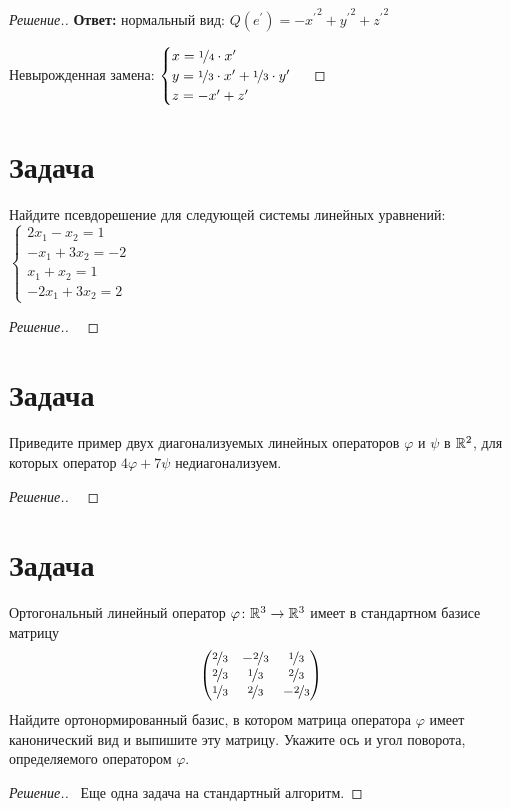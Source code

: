 \documentclass[a4paper]{article}
\theoremstyle{remark}
\newcommand{\eq}[1]{\begin{cases} #1 \end{cases}}
\begin{document}
\begin{proof}[Решение.]
            \textbf{Ответ:} нормальный вид: $Q(e^\prime) = -{x^\prime}^2 + {y^\prime}^2 + {z^\prime}^2$

            Невырожденная замена: 
            $\eq{
                x = \nicefrac14 \cdot x^\prime \\
                y = \nicefrac13 \cdot x^\prime + \nicefrac13 \cdot y^\prime \\
                z = -x^\prime + z^\prime
            }
            $

        \end{proof}

    \section*{Задача }
        Найдите псевдорешение для следующей системы линейных уравнений: 
        $\eq{
            2x_1 - x_2 = 1\\
            -x_1 + 3x_2 = -2 \\
            x_1 + x_2 = 1 \\
            -2x_1 + 3x_2 = 2
        }$
        \begin{proof}[Решение.] \ 
            

        \end{proof}
    
    \section*{Задача }
        Приведите пример двух диагонализуемых линейных операторов $\varphi$ и 
        $\psi$ в $\mathbb{R}^2$, для которых оператор $4\varphi + 7\psi$ недиагонализуем.
        \begin{proof}[Решение.] \ 
            

        \end{proof}
    
    \section*{Задача }
        Ортогональный линейный оператор $\varphi \colon \mathbb{R}^3 \to \mathbb{R}^3$ имеет в стандартном
        базисе матрицу 
        $$
        \begin{pmatrix}
            \nicefrac23 & -\nicefrac23 & \nicefrac13 \\
            \nicefrac23 & \nicefrac13 & \nicefrac23 \\
            \nicefrac13 & \nicefrac23 & -\nicefrac23 \\
        \end{pmatrix}
        $$
        Найдите ортонормированный базис, в котором матрица оператора $\varphi$ имеет 
        канонический вид и выпишите эту матрицу. Укажите ось и угол поворота, определяемого 
        оператором $\varphi$.
        \begin{proof}[Решение.] \ 
            Еще одна задача на стандартный алгоритм. 


        \end{proof}
\end{document}
